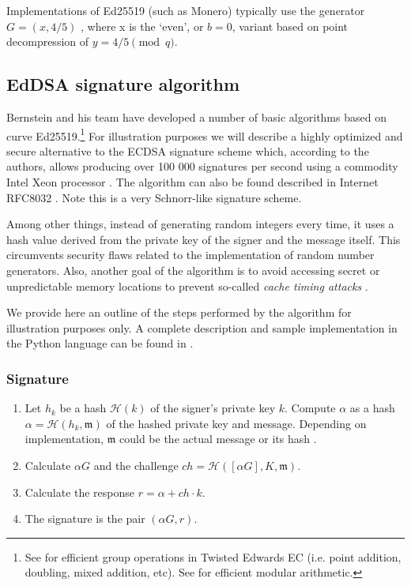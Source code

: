 Implementations of Ed25519 (such as Monero) typically use the generator $G = (x,4/5)$ \cite{Bernstein2012}, where x is the `even', or $b = 0$, variant based on point decompression of \(y = 4/5 \pmod q\).


\subsection{EdDSA signature algorithm}
\label{EdDSA_section}

Bernstein and his team have developed a number of basic algorithms based on curve Ed25519.\footnote{\label{group_ops_twisted_edwards_note}See \cite{Bernstein2007} for efficient group operations in Twisted Edwards EC (i.e. point addition, doubling, mixed addition, etc). See \cite{curve25519} for efficient modular arithmetic.}
For illustration purposes we will describe a highly optimized and secure alternative to the ECDSA signature scheme which, according to the authors, allows producing over 100 000 signatures per second using a commodity Intel Xeon processor \cite{Bernstein2012}. The algorithm can also be found described in Internet RFC8032 \cite{rfc8032}. Note this is a very Schnorr-like signature scheme.

Among other things, instead of generating random integers every time, it uses a hash value derived from the private key of the signer and the message itself. This circumvents security flaws related to the implementation of random number generators. Also, another goal of the algorithm is to avoid accessing secret or unpredictable memory locations to prevent so-called {\em cache timing attacks} \cite{Bernstein2012}.

We provide here an outline of the steps performed by the algorithm for illustration purposes only. A complete description and sample implementation in the Python language can be found in \cite{rfc8032}. 


\subsubsection{Signature}

\begin{enumerate}
	
	\item Let \(h_k\) be a hash \(\mathcal{H}(k)\) of the signer's private key \(k\). 
	Compute \(\alpha\) as a hash \(\alpha = \mathcal{H}(h_k, \mathfrak{m})\) of the hashed private key and message. Depending on implementation, $\mathfrak{m}$ could be the actual message or its hash \cite{rfc8032}.
	
	\item Calculate \(\alpha G\) and the challenge $ch = \mathcal{H}([\alpha G], K,  \mathfrak{m})$.

	\item Calculate the response \(r = \alpha + ch \cdot k \).
	
	\item The signature is the pair \((\alpha G, r)\).
\end{enumerate}


